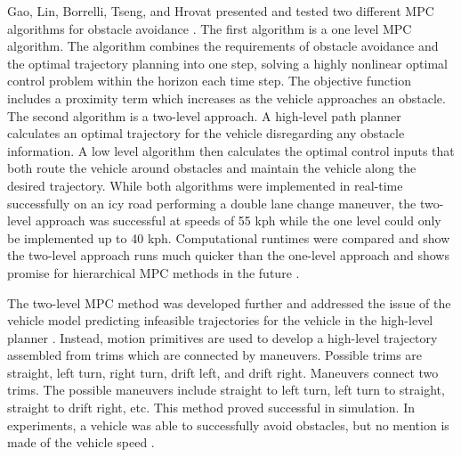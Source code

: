 \documentclass[12pt,onecolumn]{report}
\begin{document}
Gao, Lin, Borrelli, Tseng, and Hrovat presented and tested two different MPC algorithms for obstacle avoidance \cite{Gao&Borrelli2010}. The first algorithm is a one level MPC algorithm. The algorithm combines the requirements of obstacle avoidance and the optimal trajectory planning into one step, solving a highly nonlinear optimal control problem within the horizon each time step. The objective function includes a proximity term which increases as the vehicle approaches an obstacle. The second algorithm is a two-level approach. A high-level path planner calculates an optimal trajectory for the vehicle disregarding any obstacle information. A low level algorithm then calculates the optimal control inputs that both route the vehicle around obstacles and maintain the vehicle along the desired trajectory. While both algorithms were implemented in real-time successfully on an icy road performing a double lane change maneuver, the two-level approach was successful at speeds of 55 kph while the one level could only be implemented up to 40 kph. Computational runtimes were compared and show the two-level approach runs much quicker than the one-level approach and shows promise for hierarchical MPC methods in the future \cite{Gao&Borrelli2010}.

The two-level MPC method was developed further and addressed the issue of the vehicle model predicting infeasible trajectories for the vehicle in the high-level planner \cite{Gray&Gao2012}. Instead, motion primitives are used to develop a high-level trajectory assembled from trims which are connected by maneuvers. Possible trims are straight, left turn, right turn, drift left, and drift right. Maneuvers connect two trims. The possible maneuvers include straight to left turn, left turn to straight, straight to drift right, etc. This method proved successful in simulation. In experiments, a vehicle was able to successfully avoid obstacles, but no mention is made of the vehicle speed \cite{Gray&Gao2012}.
\end{document}
